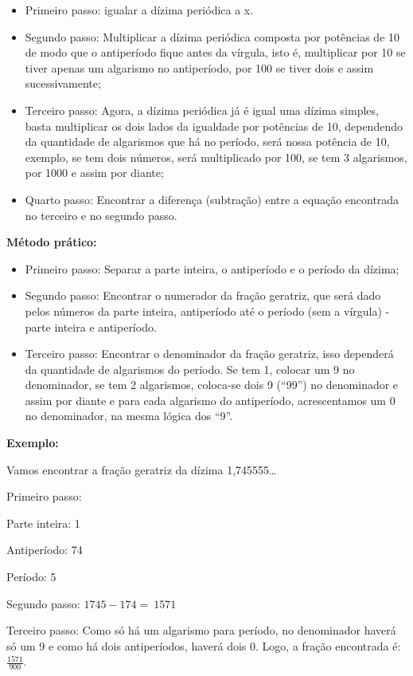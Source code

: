 \begin{itemize}
\item
  Primeiro passo: igualar a dízima periódica a x.
\item
  Segundo passo: Multiplicar a dízima periódica composta por potências
  de 10 de modo que o antiperíodo fique antes da vírgula, isto é,
  multiplicar por 10 se tiver apenas um algarismo no antiperíodo, por
  100 se tiver dois e assim sucessivamente;
\item
  Terceiro passo: Agora, a dízima periódica já é igual uma dízima
  simples, basta multiplicar os dois lados da igualdade por potências de
  10, dependendo da quantidade de algarismos que há no período, será
  nossa potência de 10, exemplo, se tem dois números, será multiplicado
  por 100, se tem 3 algarismos, por 1000 e assim por diante;
\item
  Quarto passo: Encontrar a diferença (subtração) entre a equação
  encontrada no terceiro e no segundo passo.
\end{itemize}

\textbf{Método prático:}

\begin{itemize}
\item
  Primeiro passo: Separar a parte inteira, o antiperíodo e o período da
  dízima;
\item
  Segundo passo: Encontrar o numerador da fração geratriz, que será dado
  pelos números da parte inteira, antiperíodo até o período (sem a
  vírgula) - parte inteira e antiperíodo.
\item
  Terceiro passo: Encontrar o denominador da fração geratriz, isso
  dependerá da quantidade de algarismos do período. Se tem 1, colocar um
  9 no denominador, se tem 2 algarismos, coloca-se dois 9 (``99'') no
  denominador e assim por diante e para cada algarismo do antiperíodo,
  acrescentamos um 0 no denominador, na mesma lógica dos ``9''.
\end{itemize}

\textbf{Exemplo:}

Vamos encontrar a fração geratriz da dízima 1,745555\ldots{}

Primeiro passo:

Parte inteira: 1

Antiperíodo: 74

Período: 5

Segundo passo: \(1745 - 174 = \ 1571\)

Terceiro passo: Como só há um algarismo para período, no denominador
haverá só um 9 e como há dois antiperíodos, haverá dois 0. Logo, a
fração encontrada é: \(\frac{1571}{900}.\)


